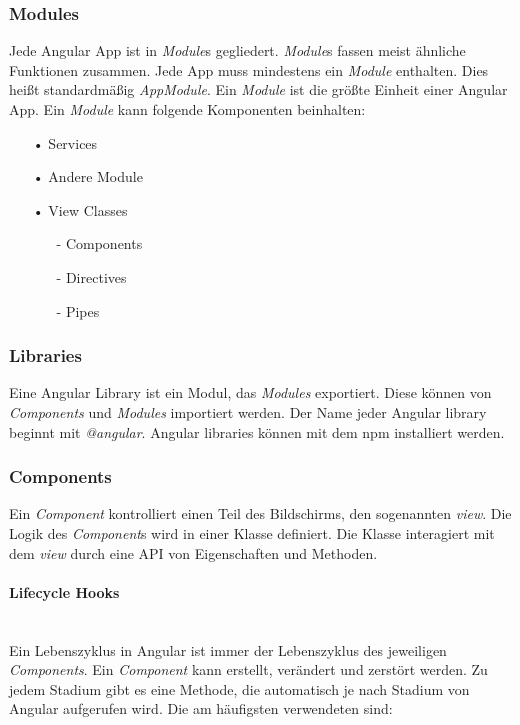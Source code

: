 
\subsubsection{Modules}
\label{sec:ang-modules}
Jede Angular App ist in \textit{Module}s gegliedert. \textit{Module}s fassen meist ähnliche Funktionen zusammen. Jede App muss mindestens ein \textit{Module} enthalten. Dies heißt standardmäßig \textit{AppModule}. Ein \textit{Module} ist die größte Einheit einer Angular App.  Ein \textit{Module} kann folgende Komponenten beinhalten:

\begin{itemize}
\item[•]Services
\item[•]Andere Module
\item[•]View Classes
\begin{itemize}
\item[-]Components
\item[-]Directives
\item[-]Pipes
\end{itemize}
\end{itemize}

\subsubsection{Libraries}
\label{sec:ang-libraries}
Eine Angular Library ist ein Modul, das \textit{Modules} exportiert. Diese können von \textit{Components} und \textit{Modules} importiert werden. Der Name jeder Angular library beginnt mit \textit{@angular}. Angular libraries können mit dem \ac{npm} installiert werden.

\subsubsection{Components}
\label{sec:ang-components}
Ein \textit{Component} kontrolliert einen Teil des Bildschirms, den sogenannten \textit{view}. Die Logik des \textit{Component}s wird in einer Klasse definiert. Die Klasse interagiert mit dem \textit{view} durch eine \ac{API} von Eigenschaften und Methoden.

\paragraph*{Lifecycle Hooks}\mbox{}\\
Ein Lebenszyklus in Angular ist immer der Lebenszyklus des jeweiligen \textit{Components}. Ein \textit{Component} kann erstellt, verändert und zerstört werden. Zu jedem Stadium gibt es eine Methode, die automatisch je nach Stadium von Angular aufgerufen wird. Die am häufigsten verwendeten sind:

